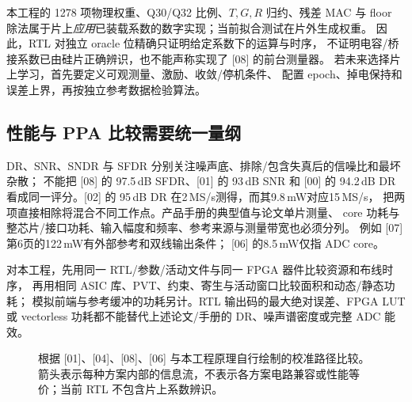 本工程的 1278 项物理权重、Q30/Q32 比例、\(T,G,R\) 归约、残差 MAC 与 floor
除法属于片上\emph{应用}已装载系数的数字实现；当前拟合测试在片外生成权重。
因此，RTL 对独立 oracle 位精确只证明给定系数下的运算与时序，
不证明电容/桥接系数已由硅片正确辨识，也不能声称实现了 [08] 的前台测量器。
若未来选择片上学习，首先要定义可观测量、激励、收敛/停机条件、
配置 epoch、掉电保持和误差上界，再按独立参考数据检验算法。

\subsection{性能与 PPA 比较需要统一量纲}
DR、SNR、SNDR 与 SFDR 分别关注噪声底、排除/包含失真后的信噪比和最坏杂散；
不能把 [08] 的 97.5\,dB SFDR、[01] 的 93\,dB SNR 和 [00] 的 94.2\,dB DR
看成同一评分。[02] 的 95\,dB DR 在2\,MS/s测得，而其9.8\,mW对应15\,MS/s，
把两项直接相除将混合不同工作点。产品手册的典型值与论文单片测量、
core 功耗与整芯片/接口功耗、输入幅度和频率、参考来源与测量带宽也必须分列。
例如 [07] 第6页的122\,mW有外部参考和双线输出条件；
[06] 的8.5\,mW仅指 ADC core。

对本工程，先用同一 RTL/参数/活动文件与同一 FPGA 器件比较资源和布线时序，
再用相同 ASIC 库、PVT、约束、寄生与活动窗口比较面积和动态/静态功耗；
模拟前端与参考缓冲的功耗另计。RTL 输出码的最大绝对误差、FPGA LUT 或
vectorless 功耗都不能替代上述论文/手册的 DR、噪声谱密度或完整 ADC 能效。

\begin{figure}[H]\centering
{}
\caption{根据 [01]、[04]、[08]、[06] 与本工程原理自行绘制的校准路径比较。箭头表示每种方案内部的信息流，不表示各方案电路兼容或性能等价；当前 RTL 不包含片上系数辨识。}
\label{fig:calibration-path-comparison}
\end{figure}
